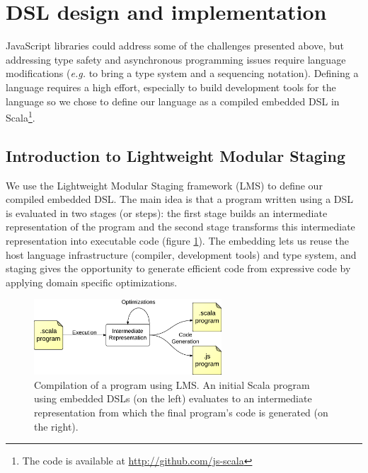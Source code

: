 \documentclass[american,english,runningheads]{llncs}
\newcommand{\eg}{\emph{e.g.}}
\begin{document}
\section{DSL design and implementation}
\label{solution}

JavaScript libraries could address some of the challenges presented above, but addressing type safety and
asynchronous programming issues require language modifications (\eg{} to bring a type system and a sequencing
notation). Defining a language requires a high effort, especially to build development tools for the language so we
chose to define our language as a compiled embedded DSL in Scala\footnote{The code is available at
\href{http://github.com/js-scala}{http://github.com/js-scala}}.

\subsection{Introduction to Lightweight Modular Staging}
\label{intro-lms}

We use the Lightweight Modular Staging framework (LMS) to define our compiled embedded DSL. The main idea is that a
program written using a DSL is evaluated in two stages (or steps): the first stage builds an intermediate
representation of the program and the second stage transforms this intermediate representation into executable code
(figure \ref{lms-diagram}). The embedding lets us reuse the host language infrastructure (compiler, development
tools) and type system, and staging gives the opportunity to generate efficient code from expressive code by applying
domain specific optimizations.

\begin{figure}
  \centering
  \includegraphics[width=7cm]{lms.pdf}
  \caption{Compilation of a program using LMS. An initial Scala program using embedded DSLs (on the left) evaluates
  to an intermediate representation from which the final program’s code is generated (on the right).}
  \label{lms-diagram}
\end{figure}
\end{document}
